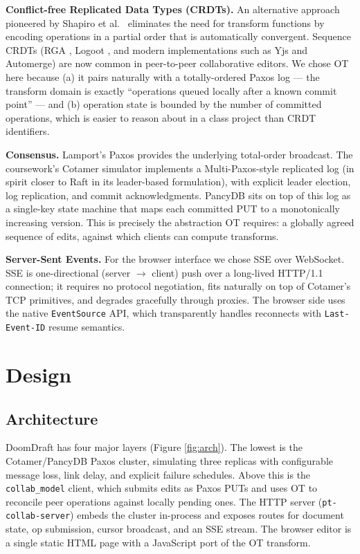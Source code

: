 \documentclass[11pt]{article}
\newcommand{\code}[1]{\texttt{#1}}
\begin{document}
\textbf{Conflict-free Replicated Data Types (CRDTs).} An alternative approach pioneered by Shapiro et al.\ \cite{crdts} eliminates the need for transform functions by encoding operations in a partial order that is automatically convergent. Sequence CRDTs (RGA \cite{rga}, Logoot \cite{logoot}, and modern implementations such as Yjs and Automerge) are now common in peer-to-peer collaborative editors. We chose OT here because (a) it pairs naturally with a totally-ordered Paxos log --- the transform domain is exactly ``operations queued locally after a known commit point'' --- and (b) operation state is bounded by the number of committed operations, which is easier to reason about in a class project than CRDT identifiers.

\textbf{Consensus.} Lamport's Paxos \cite{paxos} provides the underlying total-order broadcast. The coursework's Cotamer simulator implements a Multi-Paxos-style replicated log (in spirit closer to Raft \cite{raft} in its leader-based formulation), with explicit leader election, log replication, and commit acknowledgments. PancyDB sits on top of this log as a single-key state machine that maps each committed PUT to a monotonically increasing version. This is precisely the abstraction OT requires: a globally agreed sequence of edits, against which clients can compute transforms.

\textbf{Server-Sent Events.} For the browser interface we chose SSE \cite{sse} over WebSocket. SSE is one-directional (server $\rightarrow$ client) push over a long-lived HTTP/1.1 connection; it requires no protocol negotiation, fits naturally on top of Cotamer's TCP primitives, and degrades gracefully through proxies. The browser side uses the native \code{EventSource} API, which transparently handles reconnects with \code{Last-Event-ID} resume semantics.

\section{Design}

\subsection{Architecture}

DoomDraft has four major layers (Figure \ref{fig:arch}). The lowest is the Cotamer/PancyDB Paxos cluster, simulating three replicas with configurable message loss, link delay, and explicit failure schedules. Above this is the \code{collab\_model} client, which submits edits as Paxos PUTs and uses OT to reconcile peer operations against locally pending ones. The HTTP server (\code{pt-collab-server}) embeds the cluster in-process and exposes routes for document state, op submission, cursor broadcast, and an SSE stream. The browser editor is a single static HTML page with a JavaScript port of the OT transform.
\end{document}
